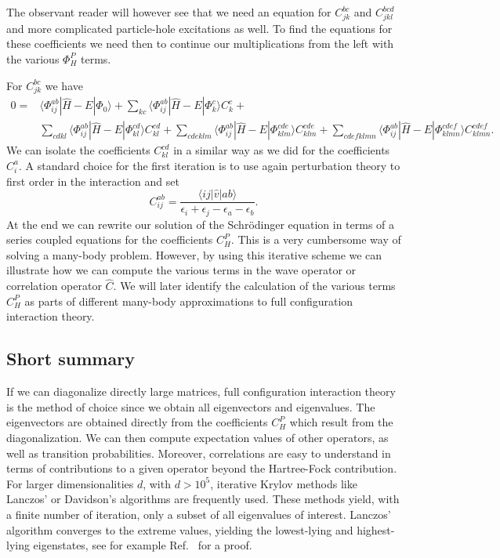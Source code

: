   The observant reader will however see that we need an equation for
  $C_{jk}^{bc}$ and $C_{jkl}^{bcd}$ and more complicated particle-hole excitations as well.  To find the equations for
  these coefficients we need then to continue our multiplications from
  the left with the various $\Phi_{H}^P$ terms.


  For $C_{jk}^{bc}$ we have
  \begin{align}\label{eq:c2p2h}
  0=&\langle \Phi_{ij}^{ab} | \hat{H} -E| \Phi_0\rangle +
  \sum_{kc}\langle \Phi_{ij}^{ab} | \hat{H} -E|\Phi_{k}^{c} \rangle
  C_{k}^{c}+ \\
  &\sum_{cdkl}\langle \Phi_{ij}^{ab} | \hat{H} -E|\Phi_{kl}^{cd}
  \rangle C_{kl}^{cd}+\sum_{cdeklm}\langle \Phi_{ij}^{ab} | \hat{H}
  -E|\Phi_{klm}^{cde} \rangle C_{klm}^{cde}+\sum_{cdefklmn}\langle
  \Phi_{ij}^{ab} | \hat{H} -E|\Phi_{klmn}^{cdef} \rangle
  C_{klmn}^{cdef}.
  \end{align}
  We can isolate the coefficients $C_{kl}^{cd}$ in a similar way
  as we did for the coefficients $C_{i}^{a}$.  A standard choice for
  the first iteration is to use again perturbation theory to first order in the interaction and set
  \[
  C_{ij}^{ab} =\frac{\langle ij \vert \hat{v} \vert ab
    \rangle}{\epsilon_i+\epsilon_j-\epsilon_a-\epsilon_b}.
  \]
  At the end we can rewrite our solution of the Schr\"odinger equation
  in terms of a series coupled equations for the coefficients $C_H^P$.
  This is a very cumbersome way of solving a many-body
  problem. However, by using this iterative scheme we can illustrate
  how we can compute the various terms in the wave operator or
  correlation operator $\hat{C}$. We will later identify the
  calculation of the various terms $C_H^P$ as parts of different
  many-body approximations to full configuration interaction theory.

  \subsection{Short summary}


  If we can diagonalize directly large matrices, full configuration interaction
  theory is the method of choice since  we obtain all  eigenvectors and eigenvalues. 
  The eigenvectors are obtained directly from the coefficients
    $C_H^P$ which result from the diagonalization.  We can then
compute expectation values of other operators,
    as well as transition probabilities. Moreover, correlations are easy to understand in terms of contributions
    to a given operator beyond the Hartree-Fock contribution. 
For larger dimensionalities $d$, with $d > 10^5$, iterative Krylov methods \cite{krylov} like Lanczos' \cite{lanczos} or Davidson's \cite{davidson} 
algorithms are frequently used. These methods yield, with a finite number of iteration, only a subset of all eigenvalues of interest. Lanczos' algorithm converges to the extreme values, yielding the lowest-lying and highest-lying eigenstates, see for example Ref.~\cite{golubvanloan} for a proof. 

